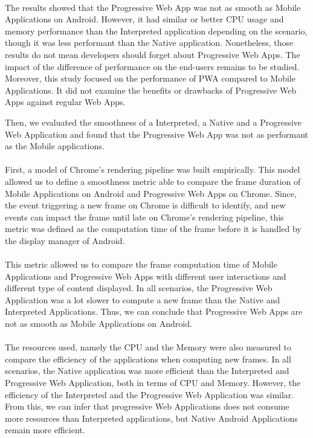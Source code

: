 \documentclass{kththesis}
\begin{document}
\paragraph{}
The results showed that the Progressive Web App was not as smooth as Mobile Applications on Android. However, it had similar or better CPU usage and memory performance than the Interpreted application depending on the scenario, though it was less performant than the Native application. \newline
Nonetheless, those results do not mean developers should forget about Progressive Web Apps. The impact of the difference of performance on the end-users remains to be studied. Moreover, this study focused on the performance of PWA compared to Mobile Applications. It did not examine the benefits or drawbacks of Progressive Web Apps against regular Web Apps.


\iffalse
Then, we evaluated the smoothness of a Interpreted, a Native and a Progressive Web Application and found that the Progressive Web App was not as performant as the Mobile applications. 
\paragraph{}
First, a model of Chrome's rendering pipeline was built empirically. This model allowed us to define a smoothness metric able to compare the frame duration of Mobile Applications on Android and Progressive Web Apps on Chrome. Since, the event triggering a new frame on Chrome is difficult to identify, and new events can impact the frame until late on Chrome's rendering pipeline, this metric was defined as the computation time of the frame before it is handled by the display manager of Android. 
\paragraph{}
This metric allowed us to compare the frame computation time of Mobile Applications and Progressive Web Apps with different user interactions and different type of content displayed. In all scenarios, the Progressive Web Application was a lot slower to compute a new frame than the Native and Interpreted Applications. Thus, we can conclude that Progressive Web Apps are not as smooth as Mobile Applications on Android. 
\paragraph{}
The resources used, namely the CPU and the Memory were also measured to compare the efficiency of the applications when computing new frames. In all scenarios, the Native application was more efficient than the Interpreted and Progressive Web Application, both in terms of CPU and Memory. However, the efficiency of the Interpreted and the Progressive Web Application was similar. From this, we can infer that progressive Web Applications does not consume more resources than Interpreted applications, but Native Android Applications remain more efficient.
\end{document}
